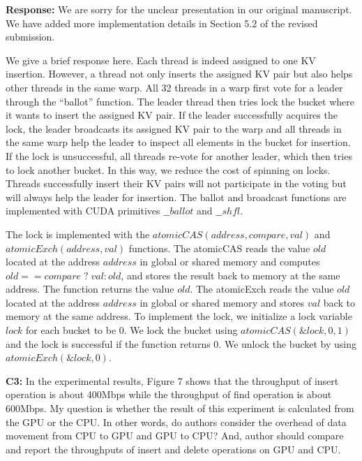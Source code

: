 \noindent\textbf{Response:} We are sorry for the unclear presentation in our original manuscript. We have added more implementation details in Section 5.2 of the revised submission. 

We give a brief response here. Each thread is indeed assigned to one KV insertion. 
However, a thread not only inserts the assigned KV pair but also helps other threads in the same warp.
All 32 threads in a warp first vote for a leader through the ``ballot'' function.
The leader thread then tries lock the bucket where it wants to insert the assigned KV pair. 
If the leader successfully acquires the lock, the leader broadcasts its assigned KV pair to the warp and all threads in the same warp help the leader to inspect all elements in the bucket for insertion. If the lock is unsuccessful, all threads re-vote for another leader, which then tries to lock another bucket. In this way, we reduce the cost of spinning on locks. Threads successfully insert their KV pairs will not participate in the voting but will always help the leader for insertion. 
The ballot and broadcast functions are implemented with CUDA primitives $\_\_ballot$ and $\_\_shfl$.

The lock is implemented with the $atomicCAS(address,compare,val)$ and $atomicExch(address,val)$ functions. 
The atomicCAS reads the value $old$ located at the address $address$ in global or shared memory and computes $old == compare \;?\; val : old$, and stores the result back to memory at the same address.
The function returns the value $old$. 
The atomicExch reads the value $old$ located at the address $address$ in global or shared memory and stores $val$ back to memory at the same address.
To implement the lock, we initialize a lock variable $lock$ for each bucket to be $0$. 
We lock the bucket using $atomicCAS(\&lock,0,1)$ and the lock is successful if the function returns $0$. 
We unlock the bucket by using $atomicExch(\&lock,0)$. 



 

\begin{shaded}
	\noindent\textbf{C3:} In the experimental results, Figure 7 shows that the throughput of insert operation is about 400Mbps while the throughput of find operation is about 600Mbps. My question is whether the result of this experiment is calculated from the GPU or the CPU. In other words, do authors consider the overhead of data movement from CPU to GPU and GPU to CPU? And, author should compare and report the throughputs of insert and delete operations on GPU and CPU.
\end{shaded}


